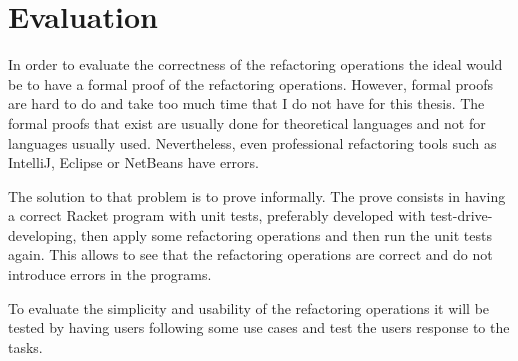 
% 
% 

\section{Evaluation}


In order to evaluate the correctness of the refactoring operations the ideal would be to have a formal proof of the refactoring operations.
However, formal proofs are hard to do and take too much time that I do not have for this thesis.
The formal proofs that exist are usually done for theoretical languages and not for languages usually used.
Nevertheless, even professional refactoring tools such as IntelliJ, Eclipse or NetBeans have errors. \cite{verbaere2006jungl} 

The solution to that problem is to prove informally. 
The prove consists in having a correct Racket program with unit tests, preferably developed with test-drive-developing, then apply some refactoring operations and then run the unit tests again. 
This allows to see that the refactoring operations are correct and do not introduce errors in the programs.

To evaluate the simplicity and usability of the refactoring operations it will be tested by having users following some use cases and test the users response to the tasks.